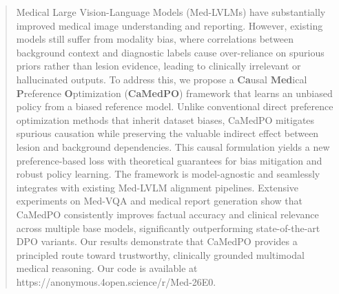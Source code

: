 \begin{abstract}
Medical Large Vision-Language Models (Med-LVLMs) have substantially improved medical image understanding and reporting.
However, existing models still suffer from modality bias, where correlations between background context and diagnostic labels cause over-reliance on spurious priors rather than lesion evidence, leading to clinically irrelevant or hallucinated outputs. 
To address this, we propose a \textbf{Ca}usal \textbf{Med}ical \textbf{P}reference \textbf{O}ptimization (\textbf{CaMedPO}) framework that learns an unbiased policy from a biased reference model. Unlike conventional direct preference optimization methods that inherit dataset biases, CaMedPO mitigates spurious causation while preserving the valuable indirect effect between lesion and background dependencies. This causal formulation yields a new preference-based loss with theoretical guarantees for bias mitigation and robust policy learning. The framework is model-agnostic and seamlessly integrates with existing Med-LVLM alignment pipelines. Extensive experiments on Med-VQA and medical report generation show that CaMedPO consistently improves factual accuracy and clinical relevance across multiple base models, significantly outperforming state-of-the-art DPO variants. Our results demonstrate that CaMedPO provides a principled route toward trustworthy, clinically grounded multimodal medical reasoning. Our code is available at https://anonymous.4open.science/r/Med-26E0.
\end{abstract}

